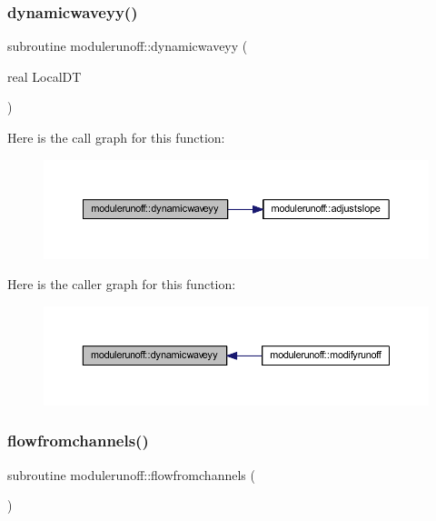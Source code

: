 \subsubsection{\texorpdfstring{dynamicwaveyy()}{dynamicwaveyy()}}
{\footnotesize\ttfamily subroutine modulerunoff\+::dynamicwaveyy (\begin{DoxyParamCaption}\item[{real}]{Local\+DT }\end{DoxyParamCaption})\hspace{0.3cm}{\ttfamily [private]}}

Here is the call graph for this function\+:\nopagebreak
\begin{figure}[H]
\begin{center}
\leavevmode
\includegraphics[width=350pt]{namespacemodulerunoff_a86d4b0ce5f4e6efc7d53702b40d97604_cgraph}
\end{center}
\end{figure}
Here is the caller graph for this function\+:\nopagebreak
\begin{figure}[H]
\begin{center}
\leavevmode
\includegraphics[width=350pt]{namespacemodulerunoff_a86d4b0ce5f4e6efc7d53702b40d97604_icgraph}
\end{center}
\end{figure}
\mbox{\label{namespacemodulerunoff_ad9add85fb1e5efe5eb239bb72e597945}} 
\subsubsection{\texorpdfstring{flowfromchannels()}{flowfromchannels()}}
{\footnotesize\ttfamily subroutine modulerunoff\+::flowfromchannels (\begin{DoxyParamCaption}{ }\end{DoxyParamCaption})\hspace{0.3cm}{\ttfamily [private]}}

